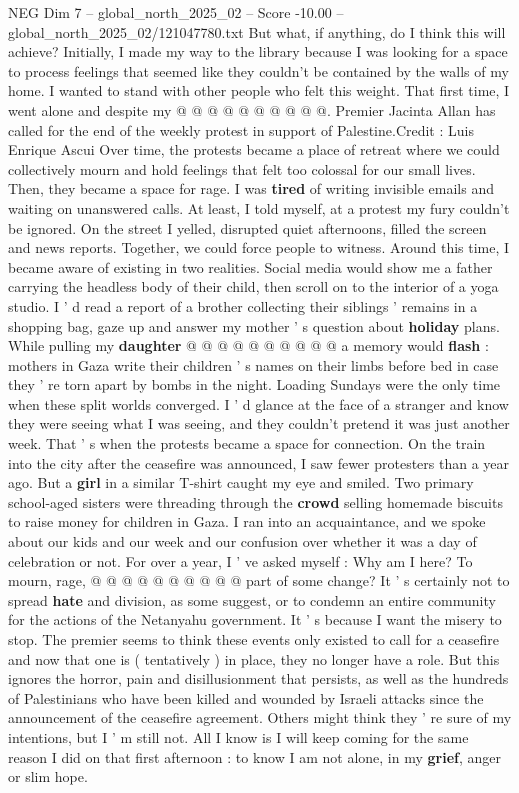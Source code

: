 \begin{textsample}{NEG Dim 7 – global\_north\_2025\_02 – Score -10.00 – global\_north\_2025\_02/121047780.txt}
But what, if anything, do I think this will achieve?
Initially, I made my way to the library because I was looking for a space to process feelings that seemed like they couldn't be contained by the walls of my home.
I wanted to stand with other people who felt this weight.
That first time, I went alone and despite my @ @ @ @ @ @ @ @ @ @.
Premier Jacinta Allan has called for the end of the weekly protest in support of Palestine.Credit : Luis Enrique Ascui Over time, the protests became a place of retreat where we could collectively mourn and hold feelings that felt too colossal for our small lives.
Then, they became a space for rage.
I was \textbf{tired} of writing invisible emails and waiting on unanswered calls.
At least, I told myself, at a protest my fury couldn't be ignored.
On the street I yelled, disrupted quiet afternoons, filled the screen and news reports.
Together, we could force people to witness.
Around this time, I became aware of existing in two realities.
Social media would show me a father carrying the headless body of their child, then scroll on to the interior of a yoga studio.
I ' d read a report of a brother collecting their siblings ' remains in a shopping bag, gaze up and answer my mother ' s question about \textbf{holiday} plans.
While pulling my \textbf{daughter} @ @ @ @ @ @ @ @ @ @ a memory would \textbf{flash} : mothers in Gaza write their children ' s names on their limbs before bed in case they ' re torn apart by bombs in the night.
Loading Sundays were the only time when these split worlds converged.
I ' d glance at the face of a stranger and know they were seeing what I was seeing, and they couldn't pretend it was just another week.
That ' s when the protests became a space for connection.
On the train into the city after the ceasefire was announced, I saw fewer protesters than a year ago.
But a \textbf{girl} in a similar T-shirt caught my eye and smiled.
Two primary school-aged sisters were threading through the \textbf{crowd} selling homemade biscuits to raise money for children in Gaza.
I ran into an acquaintance, and we spoke about our kids and our week and our confusion over whether it was a day of celebration or not.
For over a year, I ' ve asked myself : Why am I here?
To mourn, rage, @ @ @ @ @ @ @ @ @ @ part of some change?
It ' s certainly not to spread \textbf{hate} and division, as some suggest, or to condemn an entire community for the actions of the Netanyahu government.
It ' s because I want the misery to stop.
The premier seems to think these events only existed to call for a ceasefire and now that one is ( tentatively ) in place, they no longer have a role.
But this ignores the horror, pain and disillusionment that persists, as well as the hundreds of Palestinians who have been killed and wounded by Israeli attacks since the announcement of the ceasefire agreement.
Others might think they ' re sure of my intentions, but I ' m still not.
All I know is I will keep coming for the same reason I did on that first afternoon : to know I am not alone, in my \textbf{grief}, anger or slim hope.

\end{textsample}

